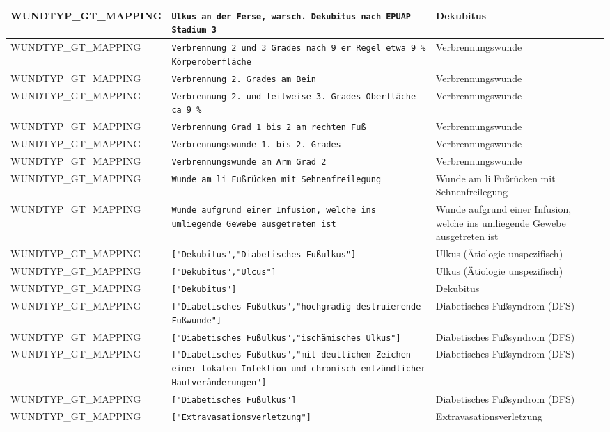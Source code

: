 \begin{longtable}{|p{3.5cm}|p{5cm}|p{6.5cm}|}
WUNDTYP\_GT\_MAPPING & \texttt{Ulkus an der Ferse, warsch. Dekubitus nach EPUAP  Stadium 3} & Dekubitus \\ \hline
WUNDTYP\_GT\_MAPPING & \texttt{Verbrennung 2 und 3 Grades nach 9 er Regel etwa 9 \% Körperoberfläche} & Verbrennungswunde \\ \hline
WUNDTYP\_GT\_MAPPING & \texttt{Verbrennung 2. Grades am Bein} & Verbrennungswunde \\ \hline
WUNDTYP\_GT\_MAPPING & \texttt{Verbrennung 2. und teilweise 3. Grades Oberfläche ca 9 \%} & Verbrennungswunde \\ \hline
WUNDTYP\_GT\_MAPPING & \texttt{Verbrennung Grad 1 bis 2 am rechten Fuß} & Verbrennungswunde \\ \hline
WUNDTYP\_GT\_MAPPING & \texttt{Verbrennungswunde 1. bis 2. Grades} & Verbrennungswunde \\ \hline
WUNDTYP\_GT\_MAPPING & \texttt{Verbrennungswunde am Arm Grad 2} & Verbrennungswunde \\ \hline
WUNDTYP\_GT\_MAPPING & \texttt{Wunde am li Fußrücken mit Sehnenfreilegung} & Wunde am li Fußrücken mit Sehnenfreilegung \\ \hline
WUNDTYP\_GT\_MAPPING & \texttt{Wunde aufgrund einer Infusion, welche ins umliegende Gewebe ausgetreten ist} & Wunde aufgrund einer Infusion, welche ins umliegende Gewebe ausgetreten ist \\ \hline
WUNDTYP\_GT\_MAPPING & \texttt{["Dekubitus","Diabetisches Fußulkus"]} & Ulkus (Ätiologie unspezifisch) \\ \hline
WUNDTYP\_GT\_MAPPING & \texttt{["Dekubitus","Ulcus"]} & Ulkus (Ätiologie unspezifisch) \\ \hline
WUNDTYP\_GT\_MAPPING & \texttt{["Dekubitus"]} & Dekubitus \\ \hline
WUNDTYP\_GT\_MAPPING & \texttt{["Diabetisches Fußulkus","hochgradig destruierende Fußwunde"]} & Diabetisches Fußsyndrom (DFS) \\ \hline
WUNDTYP\_GT\_MAPPING & \texttt{["Diabetisches Fußulkus","ischämisches Ulkus"]} & Diabetisches Fußsyndrom (DFS) \\ \hline
WUNDTYP\_GT\_MAPPING & \texttt{["Diabetisches Fußulkus","mit deutlichen Zeichen einer lokalen Infektion und chronisch entzündlicher Hautveränderungen"]} & Diabetisches Fußsyndrom (DFS) \\ \hline
WUNDTYP\_GT\_MAPPING & \texttt{["Diabetisches Fußulkus"]} & Diabetisches Fußsyndrom (DFS) \\ \hline
WUNDTYP\_GT\_MAPPING & \texttt{["Extravasationsverletzung"]} & Extravasationsverletzung \\ \hline

\end{longtable}
